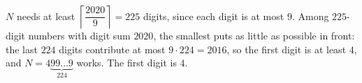 $N$ needs at least $\left\lceil\dfrac{2020}{9}\right\rceil=225$ digits, since each digit is at most $9$. Among $225$-digit numbers with digit sum $2020$, the smallest puts as little as possible in front: the last $224$ digits contribute at most $9\cdot224=2016$, so the first digit is at least $4$, and $N=4\underbrace{99\dots9}_{224}$ works. The first digit is $\boxed{4}$.
